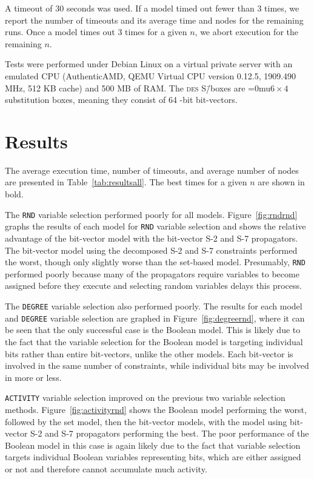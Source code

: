 \documentclass[a4paper,10pt,twoside,openright]{book}
\renewcommand{\sc}[1]{\textsc{\lowercase{#1}}}
\renewcommand{\ln}[1]{{\fontsize{8pt}{8pt}\selectfont#1}}
\newcommand*\cd[1]{\texttt{#1}}
\newcommand*\sixbyfour{\begingroup\medmuskip=0mu\relax$6 \times 4$\endgroup}
\begin{document}
A timeout of $30$ seconds was used. 
If a model timed out fewer than 3 times, we report the number of timeouts and its average time and nodes for the remaining runs. 
Once a model times out 3 times for a given $n$, we abort execution for the remaining $n$.

Tests were performed under Debian Linux on a virtual private server with an emulated CPU (AuthenticAMD, QEMU Virtual CPU version 0.12.5, 1909.490 MHz, 512 KB cache) and 500 MB of RAM. The \sc{DES} S\=/boxes are \sixbyfour{} substitution boxes, meaning they consist of 64 \ln{4}-bit bit-vectors.

\section{Results}
The average execution time, number of timeouts, and average number of nodes are presented
in Table~\ref{tab:resultsall}. The best times for a given $n$ are shown in bold.

The \cd{RND} variable selection performed poorly for all models.
Figure~\ref{fig:rndrnd} graphs the results of each model for \cd{RND} variable selection
and shows the relative advantage of the bit-vector model with 
the bit-vector S-2 and S-7 propagators.
The bit-vector model using the decomposed S-2 and S-7 constraints
performed the worst, though only slightly worse than
the set-based model.
Presumably, \cd{RND} performed poorly because many of the propagators require 
variables to become assigned before they execute and selecting random variables
delays this process.

The \cd{DEGREE} variable selection also performed poorly.
The results for each model and \cd{DEGREE} variable selection are
graphed in Figure~\ref{fig:degreernd}, 
where it can be seen that the only 
successful case is the Boolean model. 
This is likely due to the fact that the variable selection for the Boolean model
is targeting individual bits rather than entire bit-vectors, unlike the other models. 
Each bit-vector is involved in the same number of constraints, while individual bits may be involved in more or less.

\cd{ACTIVITY} variable selection improved on the previous two variable selection methods.
Figure~\ref{fig:activityrnd} shows 
the Boolean model performing the worst,
followed by the set model,
then the bit-vector models, with the model using bit-vector S-2 and S-7 propagators performing the best.
The poor performance of the Boolean model in this case is again likely due to the fact that variable selection
targets individual Boolean variables representing bits, which are either assigned or not and therefore
cannot accumulate much activity.
\end{document}
